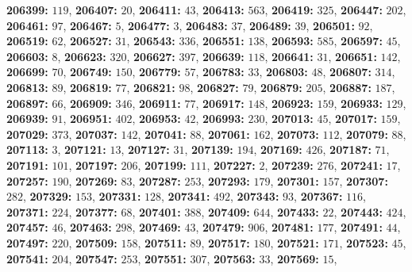 \textsf{\bfseries 206399:} $119$, \textsf{\bfseries 206407:} $20$, \textsf{\bfseries 206411:} $43$, \textsf{\bfseries 206413:} $563$, \textsf{\bfseries 206419:} $325$, \textsf{\bfseries 206447:} $202$, \textsf{\bfseries 206461:} $97$, \textsf{\bfseries 206467:} $5$, \textsf{\bfseries 206477:} $3$, \textsf{\bfseries 206483:} $37$, \textsf{\bfseries 206489:} $39$, \textsf{\bfseries 206501:} $92$, \textsf{\bfseries 206519:} $62$, \textsf{\bfseries 206527:} $31$, \textsf{\bfseries 206543:} $336$, \textsf{\bfseries 206551:} $138$, \textsf{\bfseries 206593:} $585$, \textsf{\bfseries 206597:} $45$, \textsf{\bfseries 206603:} $8$, \textsf{\bfseries 206623:} $320$, \textsf{\bfseries 206627:} $397$, \textsf{\bfseries 206639:} $118$, \textsf{\bfseries 206641:} $31$, \textsf{\bfseries 206651:} $142$, \textsf{\bfseries 206699:} $70$, \textsf{\bfseries 206749:} $150$, \textsf{\bfseries 206779:} $57$, \textsf{\bfseries 206783:} $33$, \textsf{\bfseries 206803:} $48$, \textsf{\bfseries 206807:} $314$, \textsf{\bfseries 206813:} $89$, \textsf{\bfseries 206819:} $77$, \textsf{\bfseries 206821:} $98$, \textsf{\bfseries 206827:} $79$, \textsf{\bfseries 206879:} $205$, \textsf{\bfseries 206887:} $187$, \textsf{\bfseries 206897:} $66$, \textsf{\bfseries 206909:} $346$, \textsf{\bfseries 206911:} $77$, \textsf{\bfseries 206917:} $148$, \textsf{\bfseries 206923:} $159$, \textsf{\bfseries 206933:} $129$, \textsf{\bfseries 206939:} $91$, \textsf{\bfseries 206951:} $402$, \textsf{\bfseries 206953:} $42$, \textsf{\bfseries 206993:} $230$, \textsf{\bfseries 207013:} $45$, \textsf{\bfseries 207017:} $159$, \textsf{\bfseries 207029:} $373$, \textsf{\bfseries 207037:} $142$, \textsf{\bfseries 207041:} $88$, \textsf{\bfseries 207061:} $162$, \textsf{\bfseries 207073:} $112$, \textsf{\bfseries 207079:} $88$, \textsf{\bfseries 207113:} $3$, \textsf{\bfseries 207121:} $13$, \textsf{\bfseries 207127:} $31$, \textsf{\bfseries 207139:} $194$, \textsf{\bfseries 207169:} $426$, \textsf{\bfseries 207187:} $71$, \textsf{\bfseries 207191:} $101$, \textsf{\bfseries 207197:} $206$, \textsf{\bfseries 207199:} $111$, \textsf{\bfseries 207227:} $2$, \textsf{\bfseries 207239:} $276$, \textsf{\bfseries 207241:} $17$, \textsf{\bfseries 207257:} $190$, \textsf{\bfseries 207269:} $83$, \textsf{\bfseries 207287:} $253$, \textsf{\bfseries 207293:} $179$, \textsf{\bfseries 207301:} $157$, \textsf{\bfseries 207307:} $282$, \textsf{\bfseries 207329:} $153$, \textsf{\bfseries 207331:} $128$, \textsf{\bfseries 207341:} $492$, \textsf{\bfseries 207343:} $93$, \textsf{\bfseries 207367:} $116$, \textsf{\bfseries 207371:} $224$, \textsf{\bfseries 207377:} $68$, \textsf{\bfseries 207401:} $388$, \textsf{\bfseries 207409:} $644$, \textsf{\bfseries 207433:} $22$, \textsf{\bfseries 207443:} $424$, \textsf{\bfseries 207457:} $46$, \textsf{\bfseries 207463:} $298$, \textsf{\bfseries 207469:} $43$, \textsf{\bfseries 207479:} $906$, \textsf{\bfseries 207481:} $177$, \textsf{\bfseries 207491:} $44$, \textsf{\bfseries 207497:} $220$, \textsf{\bfseries 207509:} $158$, \textsf{\bfseries 207511:} $89$, \textsf{\bfseries 207517:} $180$, \textsf{\bfseries 207521:} $171$, \textsf{\bfseries 207523:} $45$, \textsf{\bfseries 207541:} $204$, \textsf{\bfseries 207547:} $253$, \textsf{\bfseries 207551:} $307$, \textsf{\bfseries 207563:} $33$, \textsf{\bfseries 207569:} $15$, 
